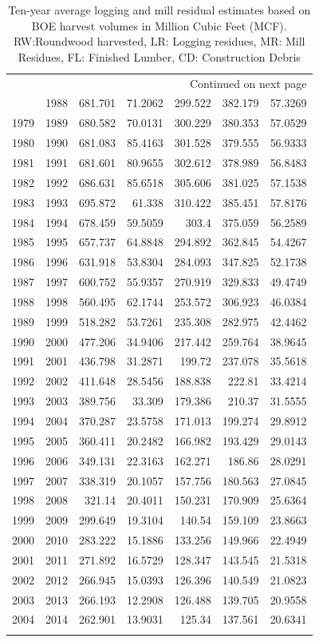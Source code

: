 \documentclass[a4paper]{article}
\begin{document}
\begin{longtable}{rrrrrrr}
\hline
\endhead
\hline\multicolumn{7}{r}{Continued on next page} \\
\endfoot
\endlastfoot
\hline
1978 & 1988 & 681.701 & 71.2062 & 299.522 & 382.179 & 57.3269\\
1979 & 1989 & 680.582 & 70.0131 & 300.229 & 380.353 & 57.0529\\
1980 & 1990 & 681.083 & 85.4163 & 301.528 & 379.555 & 56.9333\\
1981 & 1991 & 681.601 & 80.9655 & 302.612 & 378.989 & 56.8483\\
1982 & 1992 & 686.631 & 85.6518 & 305.606 & 381.025 & 57.1538\\
1983 & 1993 & 695.872 & 61.338 & 310.422 & 385.451 & 57.8176\\
1984 & 1994 & 678.459 & 59.5059 & 303.4 & 375.059 & 56.2589\\
1985 & 1995 & 657.737 & 64.8848 & 294.892 & 362.845 & 54.4267\\
1986 & 1996 & 631.918 & 53.8304 & 284.093 & 347.825 & 52.1738\\
1987 & 1997 & 600.752 & 55.9357 & 270.919 & 329.833 & 49.4749\\
1988 & 1998 & 560.495 & 62.1744 & 253.572 & 306.923 & 46.0384\\
1989 & 1999 & 518.282 & 53.7261 & 235.308 & 282.975 & 42.4462\\
1990 & 2000 & 477.206 & 34.9406 & 217.442 & 259.764 & 38.9645\\
1991 & 2001 & 436.798 & 31.2871 & 199.72 & 237.078 & 35.5618\\
1992 & 2002 & 411.648 & 28.5456 & 188.838 & 222.81 & 33.4214\\
1993 & 2003 & 389.756 & 33.309 & 179.386 & 210.37 & 31.5555\\
1994 & 2004 & 370.287 & 23.5758 & 171.013 & 199.274 & 29.8912\\
1995 & 2005 & 360.411 & 20.2482 & 166.982 & 193.429 & 29.0143\\
1996 & 2006 & 349.131 & 22.3163 & 162.271 & 186.86 & 28.0291\\
1997 & 2007 & 338.319 & 20.1057 & 157.756 & 180.563 & 27.0845\\
1998 & 2008 & 321.14 & 20.4011 & 150.231 & 170.909 & 25.6364\\
1999 & 2009 & 299.649 & 19.3104 & 140.54 & 159.109 & 23.8663\\
2000 & 2010 & 283.222 & 15.1886 & 133.256 & 149.966 & 22.4949\\
2001 & 2011 & 271.892 & 16.5729 & 128.347 & 143.545 & 21.5318\\
2002 & 2012 & 266.945 & 15.0393 & 126.396 & 140.549 & 21.0823\\
2003 & 2013 & 266.193 & 12.2908 & 126.488 & 139.705 & 20.9558\\
2004 & 2014 & 262.901 & 13.9031 & 125.34 & 137.561 & 20.6341\\
\caption{Ten-year average logging and mill residual estimates based on BOE harvest volumes in Million Cubic Feet (MCF). RW:Roundwood harvested, LR: Logging residues, MR: Mill Residues, FL: Finished Lumber, CD: Construction Debris}
\\
\end{longtable}
\end{document}
